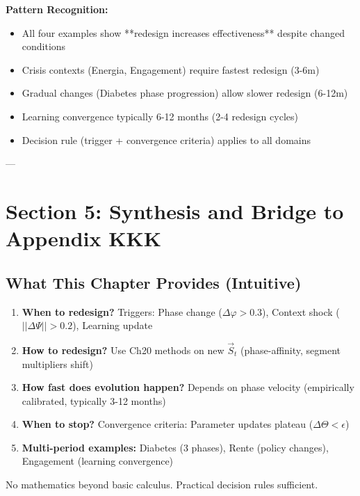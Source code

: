 \textbf{Pattern Recognition:}
\begin{itemize}[nosep]
\item All four examples show **redesign increases effectiveness** despite changed conditions
\item Crisis contexts (Energia, Engagement) require fastest redesign (3-6m)
\item Gradual changes (Diabetes phase progression) allow slower redesign (6-12m)
\item Learning convergence typically 6-12 months (2-4 redesign cycles)
\item Decision rule (trigger + convergence criteria) applies to all domains
\end{itemize}

---

\section{Section 5: Synthesis and Bridge to Appendix KKK}
\label{sec:21-synthesis}

\subsection{What This Chapter Provides (Intuitive)}

\begin{tcolorbox}[colback=green!5!white, colframe=green!75!black, title=What Ch21 Answers for Practitioners]

\begin{enumerate}
\item \textbf{When to redesign?} Triggers: Phase change ($\Delta \varphi > 0.3$), Context shock ($||\Delta \Psi|| > 0.2$), Learning update
\item \textbf{How to redesign?} Use Ch20 methods on new $\vec{S}_t$ (phase-affinity, segment multipliers shift)
\item \textbf{How fast does evolution happen?} Depends on phase velocity (empirically calibrated, typically 3-12 months)
\item \textbf{When to stop?} Convergence criteria: Parameter updates plateau ($\Delta \Theta < \epsilon$)
\item \textbf{Multi-period examples:} Diabetes (3 phases), Rente (policy changes), Engagement (learning convergence)
\end{enumerate}

No mathematics beyond basic calculus. Practical decision rules sufficient.

\end{tcolorbox}

